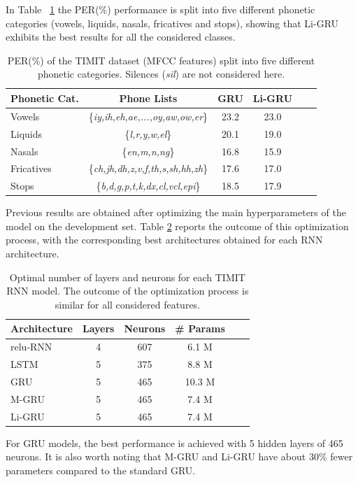 \documentclass[journal]{IEEEtran}
\begin{document}
In Table ~\ref{tab:res_ph} the PER(\%) performance is split into five different phonetic categories (vowels, liquids, nasals, fricatives and stops), showing that Li-GRU exhibits the best results for all the considered classes.
 
\begin{table}[t!]
\centering
\tabcolsep=0.20cm
    \begin{tabular}{  | l | c | c | c | c | c |}
    \cline{1-4}
Phonetic Cat. & Phone Lists & GRU & Li-GRU  \\ \hline
Vowels & \{\textit{iy,ih,eh,ae,...,oy,aw,ow,er}\} & 23.2 & 23.0  \\ \hline
Liquids & \{\textit{l,r,y,w,el}\} & 20.1 & 19.0  \\ \hline
Nasals & \{\textit{en,m,n,ng}\} & 16.8 & 15.9 \\ \hline
Fricatives & \{\textit{ch,jh,dh,z,v,f,th,s,sh,hh,zh}\} & 17.6 & 17.0 \\ \hline
Stops & \{\textit{b,d,g,p,t,k,dx,cl,vcl,epi}\} & 18.5 & 17.9 \\ \hline  
    \end{tabular}
\caption{PER(\%) of the TIMIT dataset (MFCC features) split into five different phonetic categories. Silences (\textit{sil}) are not considered here.}
\label{tab:res_ph}
\end{table}

Previous results are obtained after optimizing the main hyperparameters of the model on the development set. Table \ref{tab:opt} reports the outcome of this optimization process, with the corresponding best architectures obtained for each RNN architecture.
 \begin{table}[t!]
 \centering
 \tabcolsep=0.25cm
     \begin{tabular}{  | l | c | c | c | c | c |}
     \cline{1-4}
 Architecture & Layers & Neurons & \# Params  \\ \hline
 relu-RNN & 4 & 607 & 6.1 M   \\ \hline
 LSTM & 5 & 375 & 8.8 M   \\ \hline
 GRU & 5 & 465  & 10.3 M  \\ \hline
 M-GRU & 5 & 465 & 7.4 M  \\ \hline
 Li-GRU & 5 & 465 & 7.4 M  \\ \hline  
     \end{tabular}
 \caption{Optimal number of layers and neurons for each TIMIT RNN model. The outcome of the optimization process is similar for all considered features.}
 \label{tab:opt}
 \end{table}
For GRU models, the best performance is achieved with 5 hidden layers of 465 neurons. It is also worth noting that M-GRU and Li-GRU have about 30\% fewer parameters compared to the standard GRU.
\end{document}
